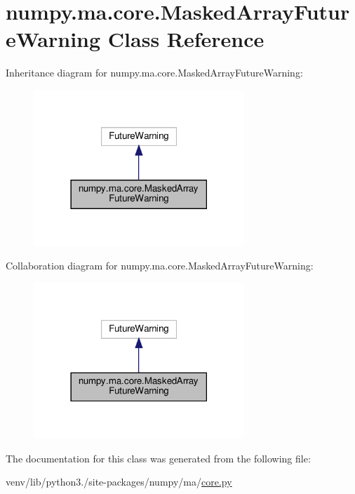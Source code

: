 \hypertarget{classnumpy_1_1ma_1_1core_1_1MaskedArrayFutureWarning}{}\section{numpy.\+ma.\+core.\+Masked\+Array\+Future\+Warning Class Reference}
\label{classnumpy_1_1ma_1_1core_1_1MaskedArrayFutureWarning}


Inheritance diagram for numpy.\+ma.\+core.\+Masked\+Array\+Future\+Warning\+:
\nopagebreak
\begin{figure}[H]
\begin{center}
\leavevmode
\includegraphics[width=225pt]{classnumpy_1_1ma_1_1core_1_1MaskedArrayFutureWarning__inherit__graph}
\end{center}
\end{figure}


Collaboration diagram for numpy.\+ma.\+core.\+Masked\+Array\+Future\+Warning\+:
\nopagebreak
\begin{figure}[H]
\begin{center}
\leavevmode
\includegraphics[width=225pt]{classnumpy_1_1ma_1_1core_1_1MaskedArrayFutureWarning__coll__graph}
\end{center}
\end{figure}


The documentation for this class was generated from the following file\+:\begin{DoxyCompactItemize}
\item 
venv/lib/python3./site-\/packages/numpy/ma/\hyperlink{numpy_2ma_2core_8py}{core.\+py}\end{DoxyCompactItemize}
